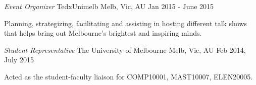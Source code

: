 


\begin{cventries}


\cventry
{\textit{Event Organizer}} %
{TedxUnimelb} %
{Melb, Vic, AU} %
{Jan 2015 - June 2015} %
{ %
\begin{cvitems}
\item {Planning, strategizing, facilitating and assisting in hosting different talk shows that helps bring out Melbourne’s brightest and inspiring minds.}
\end{cvitems}
}


\cventry
{\textit{Student Representative}} %
{The University of Melbourne} %
{Melb, Vic, AU} %
{Feb 2014, July 2015} %
{ %
\begin{cvitems}
\item {Acted as the student-faculty liaison for COMP10001, MAST10007, ELEN20005.}
\end{cvitems}
}


\end{cventries}